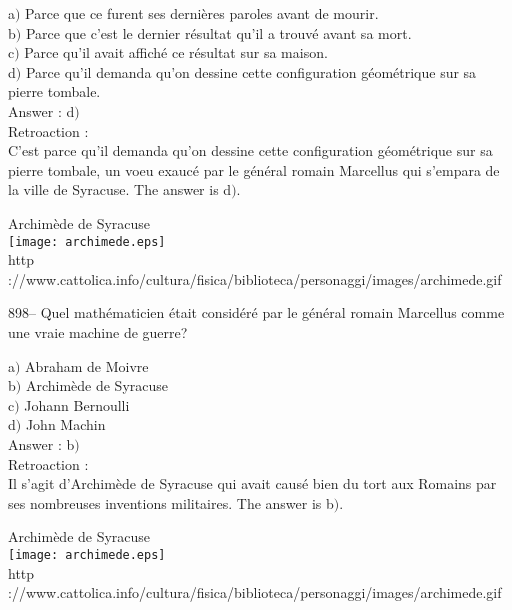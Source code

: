 ﻿\documentclass[letterpaper, 12pt]{article}
\begin{document}
a$)$ Parce que ce furent ses derni\`eres paroles avant de mourir. \\
b$)$ Parce que c'est le dernier r\'esultat qu'il a trouv\'e avant sa mort.
\\
c$)$ Parce qu'il avait affich\'e ce r\'esultat sur sa maison. \\
d$)$ Parce qu'il demanda qu'on dessine cette configuration g\'eom\'etrique
sur sa pierre tombale.\\

Answer : d$)$\\

Retroaction : \\
C'est parce qu'il demanda qu'on dessine cette configuration g\'eom\'etrique
sur sa pierre tombale,
un voeu exauc\'e par le g\'en\'eral romain Marcellus qui s'empara de la
ville de Syracuse. The answer is d$)$.\\

        \begin{center}
        Archim\`ede de Syracuse\\
    \texttt{[image: archimede.eps]}\\
        {\footnotesize http
://www.cattolica.info/cultura/fisica/biblioteca/personaggi/images/archimede.gif}
    \end{center}

898-- Quel math\'ematicien \'etait consid\'er\'e par le g\'en\'eral
romain Marcellus comme une vraie machine de guerre?

a$)$ Abraham de Moivre \\
b$)$ Archim\`ede de Syracuse \\
c$)$ Johann Bernoulli \\
d$)$ John Machin \\

Answer : b$)$\\

Retroaction :\\
Il s'agit d'Archim\`ede de Syracuse qui avait caus\'e bien du tort
aux Romains par ses nombreuses inventions
militaires. The answer is b$)$.\\

        \begin{center}
        Archim\`ede de Syracuse\\
    \texttt{[image: archimede.eps]}\\
        {\footnotesize http
://www.cattolica.info/cultura/fisica/biblioteca/personaggi/images/archimede.gif}
    \end{center}
\end{document}
